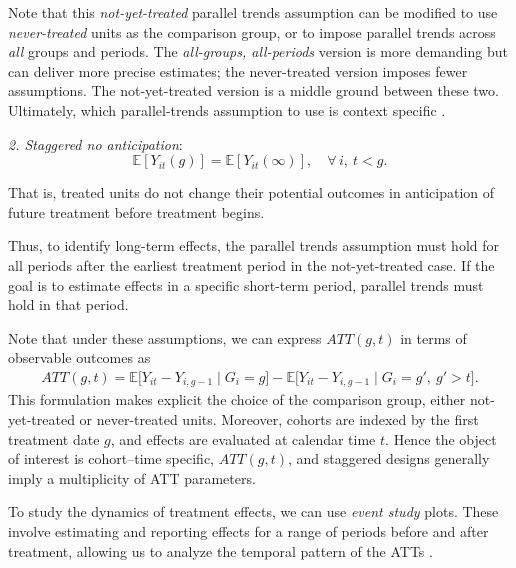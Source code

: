 Note that this \textit{not-yet-treated} parallel trends assumption can be modified to use \textit{never-treated} units as the comparison group, or to impose parallel trends across \textit{all} groups and periods. The \textit{all-groups, all-periods} version is more demanding but can deliver more precise estimates; the never-treated version imposes fewer assumptions. The not-yet-treated version is a middle ground between these two. Ultimately, which parallel-trends assumption to use is context specific \cite{baker2025did_guide}.

\textit{2. Staggered no anticipation}:
\begin{equation}
	\mathbb{E}[Y_{it}(g)] = \mathbb{E}[Y_{it}(\infty)], \quad \forall\, i,\ t < g.
\end{equation}

That is, treated units do not change their potential outcomes in anticipation of future treatment before treatment begins.

Thus, to identify long-term effects, the parallel trends assumption must hold for all periods after the earliest treatment period in the not-yet-treated case. If the goal is to estimate effects in a specific short-term period, parallel trends must hold in that period.

Note that under these assumptions, we can express $ATT(g,t)$ in terms of observable outcomes as \cite{roth2023whats}
\begin{align*}
	ATT(g,t) 
	= \mathbb{E}\big[ Y_{it} - Y_{i, g-1} \mid G_i = g \big]
	- \mathbb{E}\big[ Y_{it} - Y_{i, g-1} \mid G_i = g', \ g' > t \big].
\end{align*}
This formulation makes explicit the choice of the comparison group, either not-yet-treated or never-treated units. Moreover, cohorts are indexed by the first treatment date $g$, and effects are evaluated at calendar time $t$. Hence the object of interest is cohort–time specific, $ATT(g,t)$, and staggered designs generally imply a multiplicity of ATT parameters.

To study the dynamics of treatment effects, we can use \textit{event study} plots. These involve estimating and reporting effects for a range of periods before and after treatment, allowing us to analyze the temporal pattern of the ATTs \cite{baker2025did_guide}. 

